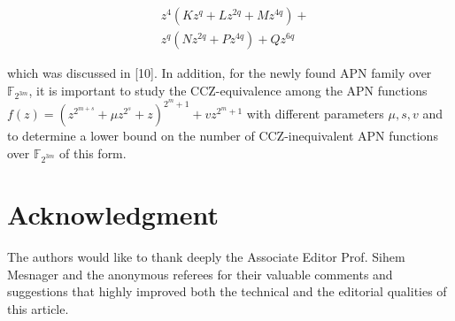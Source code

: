 \documentclass[10pt]{article}
\begin{document}
$$
\begin{aligned}
& z^{4}\left(K z^{q}+L z^{2 q}+M z^{4 q}\right)+ \\
& z^{q}\left(N z^{2 q}+P z^{4 q}\right)+Q z^{6 q}
\end{aligned}
$$

which was discussed in [10]. In addition, for the newly found APN family over $\mathbb{F}_{2^{3 m}}$, it is important to study the CCZ-equivalence among the APN functions $f(z)= \left(z^{2^{m+s}}+\mu z^{2^{s}}+z\right)^{2^{m}+1}+v z^{2^{m}+1}$ with different parameters $\mu, s, v$ and to determine a lower bound on the number of CCZ-inequivalent APN functions over $\mathbb{F}_{2^{3 m}}$ of this form.

\section*{Acknowledgment}
The authors would like to thank deeply the Associate Editor Prof. Sihem Mesnager and the anonymous referees for their valuable comments and suggestions that highly improved both the technical and the editorial qualities of this article.
\end{document}
